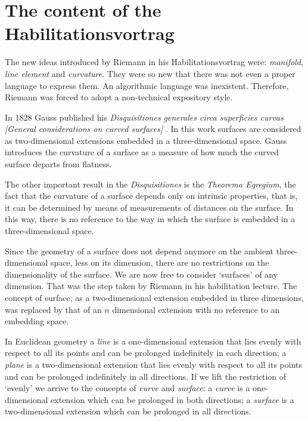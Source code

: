 \documentclass[12pt]{article}
\begin{document}
\section{The content of the Habilitationsvortrag}

The new ideas introduced by Riemann in his Habilitationsvortrag were: {\it manifold}, {\it line element} and {\it curvature}. They were so new that there was not even a proper language to express them. An algorithmic language was inexistent. Therefore, Riemann was forced to adopt a non-technical expository style.

In 1828 Gauss published his {\it Disquisitiones generales circa superficies curvas} {\it [General considerations on curved surfaces]} \cite{Gauss1828}. In this work surfaces are considered as two-dimensional extensions embedded in a three-dimensional space. Gauss introduces the curvature of a surface as a measure of how much the curved surface departs from flatness.

The other important result in the {\it Disquisitiones} is the {\it Theorema Egregium}, the fact that the curvature of a surface depends only on intrinsic properties, that is, it can be determined by means of measurements of distances on the surface. In this way, there is no reference to the way in which the surface is embedded in a three-dimensional space. 

Since the geometry of a surface does not depend anymore on the ambient three-dimensional space, less on its dimension, there are no restrictions on the dimensionality of the surface. We are now free to consider `surfaces' of any dimension. That was the step taken by Riemann in his habilitation lecture. The concept of surface, as a two-dimensional extension embedded in three dimensions, was replaced by that of an $n$ dimensional extension with no reference to an embedding space.

In Euclidean geometry a {\it line} is a one-dimensional extension that lies evenly with respect to all its points and can be prolonged indefinitely in each direction; a {\it plane} is a two-dimensional extension that lies evenly with respect to all its points and can be prolonged indefinitely in all directions. If we lift the restriction of `evenly' we arrive to the concepts of {\it curve} and {\it surface}: a {\it curve} is a one-dimensional extension which can be prolonged in both directions; a {\it surface} is a two-dimensional extension which can be prolonged in all directions.
\end{document}
